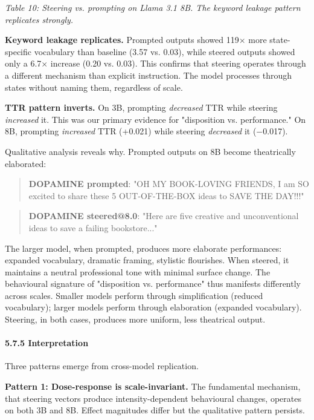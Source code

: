 \documentclass[11pt,a4paper]{article}
\begin{document}
\emph{Table 10: Steering vs. prompting on Llama 3.1 8B. The keyword leakage pattern replicates strongly.}

\textbf{Keyword leakage replicates.} Prompted outputs showed 119\ensuremath{\times} more state-specific vocabulary than baseline (3.57 vs. 0.03), while steered outputs showed only a 6.7\ensuremath{\times} increase (0.20 vs. 0.03). This confirms that steering operates through a different mechanism than explicit instruction. The model processes through states without naming them, regardless of scale.

\textbf{TTR pattern inverts.} On 3B, prompting \emph{decreased} TTR while steering \emph{increased} it. This was our primary evidence for "disposition vs. performance." On 8B, prompting \emph{increased} TTR (+0.021) while steering \emph{decreased} it (\ensuremath{-}0.017).

Qualitative analysis reveals why. Prompted outputs on 8B become theatrically elaborated:

\begin{quote}
\textbf{DOPAMINE prompted}: "OH MY BOOK-LOVING FRIENDS, I am SO excited to share these 5 OUT-OF-THE-BOX ideas to SAVE THE DAY!!!"
\end{quote}

\begin{quote}
\textbf{DOPAMINE steered@8.0}: "Here are five creative and unconventional ideas to save a failing bookstore..."
\end{quote}

The larger model, when prompted, produces more elaborate performances: expanded vocabulary, dramatic framing, stylistic flourishes. When steered, it maintains a neutral professional tone with minimal surface change. The behavioural signature of "disposition vs. performance" thus manifests differently across scales. Smaller models perform through simplification (reduced vocabulary); larger models perform through elaboration (expanded vocabulary). Steering, in both cases, produces more uniform, less theatrical output.

\paragraph{5.7.5 Interpretation}

Three patterns emerge from cross-model replication.

\textbf{Pattern 1: Dose-response is scale-invariant.} The fundamental mechanism, that steering vectors produce intensity-dependent behavioural changes, operates on both 3B and 8B. Effect magnitudes differ but the qualitative pattern persists.
\end{document}
